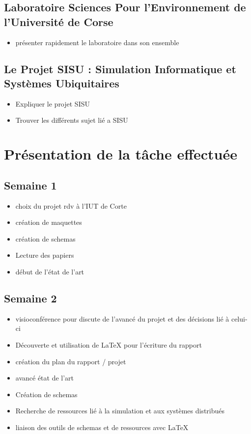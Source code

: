 \documentclass{rapport_stage}
\begin{document}
\section*{Laboratoire Sciences Pour l'Environnement de l'Université de Corse}

\begin{itemize}[label=$\bullet$]
  \item présenter rapidement le laboratoire dans son ensemble
\end{itemize}

\section*{Le Projet SISU : Simulation Informatique et Systèmes Ubiquitaires}

\begin{itemize}[label=$\bullet$]
  \item Expliquer le projet SISU
  \item Trouver les différents sujet lié a SISU
\end{itemize}

\cleardoublepage

\chapter{Présentation de la tâche effectuée}

\section*{Semaine 1}

\begin{itemize}[label=$\bullet$]
  \item choix du projet rdv à l’IUT de Corte
  \item création de maquettes
  \item création de schemas
  \item Lecture des papiers
  \item début de l'état de l'art
\end{itemize}

\section*{Semaine 2}

\begin{itemize}[label=$\bullet$]
  \item visioconférence pour discute de l'avancé du projet et des décisions lié à celui-ci
  \item Découverte et utilisation de LaTeX pour l'écriture du rapport
  \item création du plan du rapport / projet
  \item avancé état de l'art
  \item Création de schemas
  \item Recherche de ressources lié à la simulation et aux systèmes distribués
  \item liaison des outils de schemas et de ressources avec LaTeX
\end{itemize}
\end{document}
